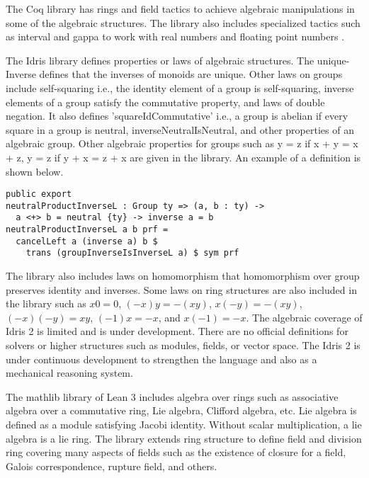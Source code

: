 The Coq library has rings and field tactics to achieve algebraic manipulations
in some of the algebraic structures. The library also includes specialized
tactics such as interval and gappa to work with real numbers and floating point
numbers \cite{Paulin-Mohring2012}. 

The Idris library defines properties or laws of algebraic structures. The
unique-Inverse defines that the inverses of monoids are unique. Other laws on
groups include self-squaring i.e., the identity element of a group is
self-squaring, inverse elements of a group satisfy the commutative property, and
laws of double negation. It also defines 'squareIdCommutative' i.e., a group is
abelian if every square in a group is neutral, inverseNeutralIsNeutral, and
other properties of an algebraic group. Other algebraic properties for groups
such as y = z if x + y = x + z, y = z if y + x = z + x are given in the library.
An example of a definition is shown below.

\begin{verbatim}
public export
neutralProductInverseL : Group ty => (a, b : ty) ->
  a <+> b = neutral {ty} -> inverse a = b
neutralProductInverseL a b prf =
  cancelLeft a (inverse a) b $
    trans (groupInverseIsInverseL a) $ sym prf
\end{verbatim}

The library also includes laws on homomorphism that homomorphism over group
preserves identity and inverses. Some laws on ring structures are also included
in the library such as $x0 = 0$, $(-x)y = -(xy)$, $x(-y) = -(xy)$, $(-x)(-y) =
xy$, $(-1)x = -x$, and $x(-1) = -x$. The algebraic coverage of Idris 2 is
limited and is under development. There are no official definitions for solvers
or higher structures such as modules, fields, or vector space. The Idris 2 is
under continuous development to strengthen the language and also as a mechanical
reasoning system. 

The mathlib library of Lean 3 includes algebra over rings such as associative
algebra over a commutative ring, Lie algebra, Clifford algebra, etc. Lie algebra
is defined as a module satisfying Jacobi identity. Without scalar
multiplication, a lie algebra is a lie ring. The library extends ring structure
to define field and division ring covering many aspects of fields such as the
existence of closure for a field, Galois correspondence, rupture field, and
others.